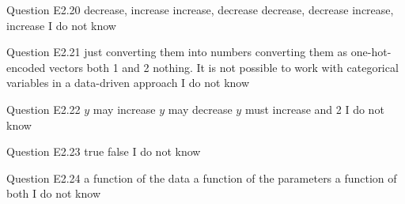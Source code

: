 \begin{frame}{Question E2.20}
	\QuestionNotes{}
	\QuestionAnswers
	{
		\correctanswer decrease, increase
		\answer increase, decrease
		\answer decrease, decrease
		\answer increase, increase
		\answer I do not know
	}
\end{frame}


\begin{frame}{Question E2.21}
	\QuestionNotes{}
	\QuestionAnswers
	{
		\answer just converting them into numbers
		\correctanswer converting them as one-hot-encoded vectors
		\answer both 1 and 2
		\answer nothing. It is not possible to work with categorical variables in a data-driven approach
		\answer I do not know
	}
\end{frame}


\begin{frame}{Question E2.22}
	\QuestionNotes{}
	\QuestionAnswers
	{
		\answer $y$ may increase
		\answer $y$ may decrease
		\answer $y$ must increase
		 and 2
		\answer I do not know
	}
\end{frame}

\begin{frame}{Question E2.23}
	\QuestionAnswers
	{
		\answer true
		\correctanswer false
		\answer I do not know
	}
\end{frame}

\begin{frame}{Question E2.24}
	\QuestionNotes{}
	\QuestionAnswers
	{
		\answer a function of the data
		\answer a function of the parameters
		\correctanswer a function of both
		\answer I do not know
	}
\end{frame}


